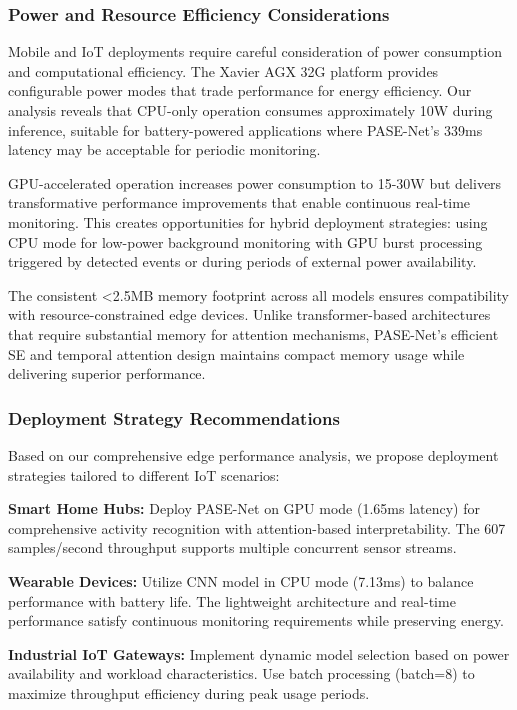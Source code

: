 \subsubsection{Power and Resource Efficiency Considerations}

Mobile and IoT deployments require careful consideration of power consumption and computational efficiency. The Xavier AGX 32G platform provides configurable power modes that trade performance for energy efficiency. Our analysis reveals that CPU-only operation consumes approximately 10W during inference, suitable for battery-powered applications where PASE-Net's 339ms latency may be acceptable for periodic monitoring.

GPU-accelerated operation increases power consumption to 15-30W but delivers transformative performance improvements that enable continuous real-time monitoring. This creates opportunities for hybrid deployment strategies: using CPU mode for low-power background monitoring with GPU burst processing triggered by detected events or during periods of external power availability.

The consistent <2.5MB memory footprint across all models ensures compatibility with resource-constrained edge devices. Unlike transformer-based architectures that require substantial memory for attention mechanisms, PASE-Net's efficient SE and temporal attention design maintains compact memory usage while delivering superior performance.

\subsubsection{Deployment Strategy Recommendations}

Based on our comprehensive edge performance analysis, we propose deployment strategies tailored to different IoT scenarios:

\textbf{Smart Home Hubs:} Deploy PASE-Net on GPU mode (1.65ms latency) for comprehensive activity recognition with attention-based interpretability. The 607 samples/second throughput supports multiple concurrent sensor streams.

\textbf{Wearable Devices:} Utilize CNN model in CPU mode (7.13ms) to balance performance with battery life. The lightweight architecture and real-time performance satisfy continuous monitoring requirements while preserving energy.

\textbf{Industrial IoT Gateways:} Implement dynamic model selection based on power availability and workload characteristics. Use batch processing (batch=8) to maximize throughput efficiency during peak usage periods.

